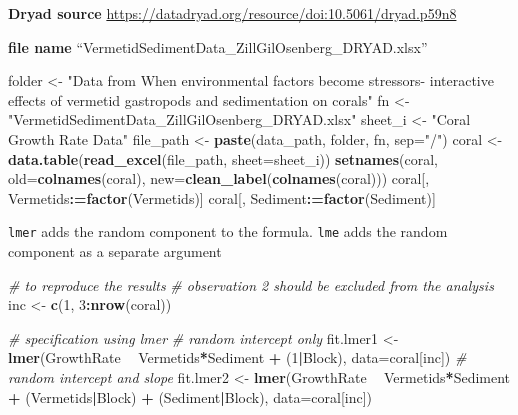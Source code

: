 \documentclass[]{book}
\newenvironment{Shaded}{\begin{snugshade}}{\end{snugshade}}
\newcommand{\KeywordTok}[1]{\textcolor[rgb]{0.13,0.29,0.53}{\textbf{#1}}}
\newcommand{\DataTypeTok}[1]{\textcolor[rgb]{0.13,0.29,0.53}{#1}}
\newcommand{\DecValTok}[1]{\textcolor[rgb]{0.00,0.00,0.81}{#1}}
\newcommand{\StringTok}[1]{\textcolor[rgb]{0.31,0.60,0.02}{#1}}
\newcommand{\CommentTok}[1]{\textcolor[rgb]{0.56,0.35,0.01}{\textit{#1}}}
\newcommand{\OperatorTok}[1]{\textcolor[rgb]{0.81,0.36,0.00}{\textbf{#1}}}
\newcommand{\ErrorTok}[1]{\textcolor[rgb]{0.64,0.00,0.00}{\textbf{#1}}}
\newcommand{\NormalTok}[1]{#1}
\begin{document}
\textbf{Dryad source}
\url{https://datadryad.org/resource/doi:10.5061/dryad.p59n8}

\textbf{file name} ``VermetidSedimentData\_ZillGilOsenberg\_DRYAD.xlsx''

\begin{Shaded}
\begin{Highlighting}[]
\NormalTok{folder <-}\StringTok{ "Data from When environmental factors become stressors- interactive effects of vermetid gastropods and sedimentation on corals"}
\NormalTok{fn <-}\StringTok{ "VermetidSedimentData_ZillGilOsenberg_DRYAD.xlsx"}
\NormalTok{sheet_i <-}\StringTok{ "Coral Growth Rate Data"}
\NormalTok{file_path <-}\StringTok{ }\KeywordTok{paste}\NormalTok{(data_path, folder, fn, }\DataTypeTok{sep=}\StringTok{"/"}\NormalTok{)}
\NormalTok{coral <-}\StringTok{ }\KeywordTok{data.table}\NormalTok{(}\KeywordTok{read_excel}\NormalTok{(file_path, }\DataTypeTok{sheet=}\NormalTok{sheet_i))}
\KeywordTok{setnames}\NormalTok{(coral, }\DataTypeTok{old=}\KeywordTok{colnames}\NormalTok{(coral), }\DataTypeTok{new=}\KeywordTok{clean_label}\NormalTok{(}\KeywordTok{colnames}\NormalTok{(coral)))}
\NormalTok{coral[, Vermetids}\OperatorTok{:}\ErrorTok{=}\KeywordTok{factor}\NormalTok{(Vermetids)]}
\NormalTok{coral[, Sediment}\OperatorTok{:}\ErrorTok{=}\KeywordTok{factor}\NormalTok{(Sediment)]}
\end{Highlighting}
\end{Shaded}

\texttt{lmer} adds the random component to the formula. \texttt{lme}
adds the random component as a separate argument

\begin{Shaded}
\begin{Highlighting}[]
\CommentTok{# to reproduce the results}
\CommentTok{# observation 2 should be excluded from the analysis}
\NormalTok{inc <-}\StringTok{ }\KeywordTok{c}\NormalTok{(}\DecValTok{1}\NormalTok{, }\DecValTok{3}\OperatorTok{:}\KeywordTok{nrow}\NormalTok{(coral))}

\CommentTok{# specification using lmer}
\CommentTok{# random intercept only}
\NormalTok{fit.lmer1 <-}\StringTok{ }\KeywordTok{lmer}\NormalTok{(GrowthRate }\OperatorTok{~}\StringTok{ }\NormalTok{Vermetids}\OperatorTok{*}\NormalTok{Sediment }\OperatorTok{+}\StringTok{ }\NormalTok{(}\DecValTok{1}\OperatorTok{|}\NormalTok{Block), }\DataTypeTok{data=}\NormalTok{coral[inc])}
\CommentTok{# random intercept and slope}
\NormalTok{fit.lmer2 <-}\StringTok{ }\KeywordTok{lmer}\NormalTok{(GrowthRate }\OperatorTok{~}\StringTok{ }\NormalTok{Vermetids}\OperatorTok{*}\NormalTok{Sediment }\OperatorTok{+}\StringTok{ }\NormalTok{(Vermetids}\OperatorTok{|}\NormalTok{Block) }\OperatorTok{+}\StringTok{ }\NormalTok{(Sediment}\OperatorTok{|}\NormalTok{Block), }\DataTypeTok{data=}\NormalTok{coral[inc])}
\end{Highlighting}
\end{Shaded}
\end{document}
